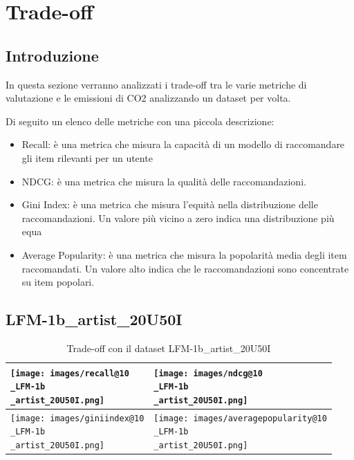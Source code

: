 \section{Trade-off}


\subsection{Introduzione}
In questa sezione verranno analizzati i trade-off tra le varie metriche di valutazione e le emissioni di CO2 analizzando un dataset per volta.

Di seguito un elenco delle metriche con una piccola descrizione:
\begin{itemize}
    \item Recall: è una metrica che misura la capacità di un modello di raccomandare gli item rilevanti per un utente
    \item NDCG: è una metrica che misura la qualità delle raccomandazioni.
    \item Gini Index: è una metrica che misura l'equità nella distribuzione delle raccomandazioni. Un valore più vicino a zero indica una distribuzione più equa
    \item Average Popularity: è una metrica che misura la popolarità media degli item raccomandati. Un valore alto indica che le raccomandazioni sono concentrate su item popolari.
\end{itemize}

\subsection{LFM-1b\_artist\_20U50I}


\begin{table}[H]
    \centering
    \footnotesize
    \setlength\tabcolsep{0pt}
    \begin{tabularx}{\textwidth}{|X|X|}
        \hline
        \texttt{[image: images/recall@10\\\_LFM-1b\\\_artist\_20U50I.png]} &
        \texttt{[image: images/ndcg@10\\\_LFM-1b\\\_artist\_20U50I.png]} \\
        \hline
        \texttt{[image: images/giniindex@10\\\_LFM-1b\\\_artist\_20U50I.png]} &
        \texttt{[image: images/averagepopularity@10\\\_LFM-1b\\\_artist\_20U50I.png]} \\
        \hline
    \end{tabularx}
    \caption{Trade-off con il dataset LFM-1b\_artist\_20U50I}
    \label{tab:emissions_info}
\end{table}

